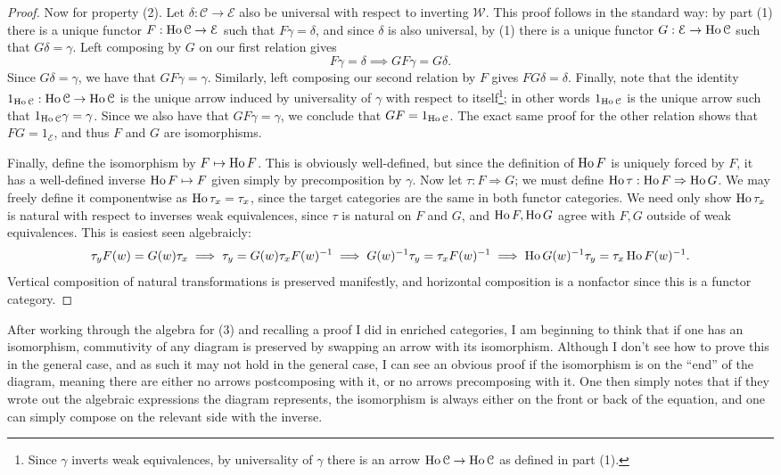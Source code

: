 \begin{proof}
	Now for property (2). Let $\delta : \mathcal{C}  \to \mathcal{E} $ also be universal with respect to inverting $\mathcal{W} $. This proof follows in the standard way: by part (1) there is a unique functor $F : \operatorname{Ho} \mathcal{C}  \to \mathcal{E} $ such that $F\gamma=\delta$, and since $\delta $ is also universal, by (1) there is a unique functor $G : \mathcal{E}  \to \operatorname{Ho} \mathcal{C} $ such that $G\delta=\gamma$. Left composing by $G$ on our first relation gives
	\[
		F\gamma=\delta \implies GF\gamma=G\delta
	.\]
	Since $G\delta = \gamma$, we have that $GF\gamma=\gamma$. Similarly, left composing our second relation by $F$ gives $FG\delta=\delta$. Finally, note that the identity $1_{\operatorname{Ho} \mathcal{C} } : \operatorname{Ho} \mathcal{C}  \to \operatorname{Ho} \mathcal{C} $ is the unique arrow induced by universality of $\gamma$ with respect to itself\footnote{Since $\gamma$ inverts weak equivalences, by universality of $\gamma$ there is an arrow $\operatorname{Ho} \mathcal{C} \to \operatorname{Ho} \mathcal{C} $ as defined in part (1).}; in other words $1_{\operatorname{Ho} \mathcal{C} } $ is the unique arrow such that $1_{\operatorname{Ho} \mathcal{C} } \gamma=\gamma$. Since we also have that $GF\gamma=\gamma$, we conclude that $GF=1_{\operatorname{Ho} \mathcal{C} } $. The exact same proof for the other relation shows that $FG=1_\mathcal{E} $, and thus $F$ and $G$ are isomorphisms.

	Finally, define the isomorphism by $F\mapsto \operatorname{Ho} F$. This is obviously well-defined, but since the definition of $\operatorname{Ho} F$ is uniquely forced by $F$, it has a well-defined inverse $\operatorname{Ho} F\mapsto F$ given simply by precomposition by $\gamma$. Now let $\tau : F \Rightarrow G$; we must define $\operatorname{Ho} \tau : \operatorname{Ho} F \Rightarrow \operatorname{Ho} G$. We may freely define it componentwise as $\operatorname{Ho} \tau_x=\tau_x$, since the target categories are the same in both functor categories. We need only show $\operatorname{Ho} \tau_x$ is natural with respect to inverses weak equivalences, since $\tau$ is natural on $F$ and $G$, and $\operatorname{Ho} F,\operatorname{Ho} G$ agree with $F,G$ outside of weak equivalences. This is easiest seen algebraicly:
	\[
		\tau_y F(w)=G(w)\tau_x \implies \tau_y=G(w)\tau_x F(w)^{-1} \implies G(w)^{-1} \tau_y = \tau_x F(w)^{-1} \implies \operatorname{Ho} G(w)^{-1} \tau_y = \tau_x \operatorname{Ho} F(w)^{-1} 
	.\]
	Vertical composition of natural transformations is preserved manifestly, and horizontal composition is a nonfactor since this is a functor category. 
\end{proof}

\begin{remark}\label{1.2.5}
	After working through the algebra for (3) and recalling a proof I did in enriched categories, I am beginning to think that if one has an isomorphism, commutivity of any diagram is preserved by swapping an arrow with its isomorphism. Although I don't see how to prove this in the general case, and as such it may not hold in the general case, I can see an obvious proof if the isomorphism is on the ``end'' of the diagram, meaning there are either no arrows postcomposing with it, or no arrows precomposing with it. One then simply notes that if they wrote out the algebraic expressions the diagram represents, the isomorphism is always either on the front or back of the equation, and one can simply compose on the relevant side with the inverse.
\end{remark}

